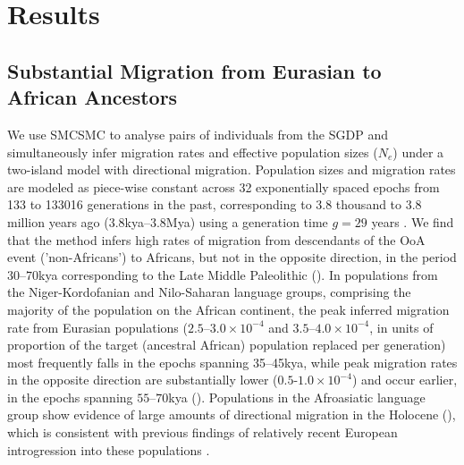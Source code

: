 \section{Results}

\subsection{Substantial Migration from Eurasian to African Ancestors} We use SMCSMC to analyse pairs of individuals from the SGDP and simultaneously infer migration rates and effective population sizes ($N_e$) under a two-island model with directional migration.  Population sizes and migration rates are modeled as piece-wise constant across 32 exponentially spaced epochs from 133 to 133016 generations in the past, corresponding to 3.8 thousand to 3.8 million years ago (3.8kya--3.8Mya) using a generation time $g=29$ years \cite{Fenner2005}.  We find that the method infers high rates of migration from descendants of the OoA event ('non-Africans') to Africans, but not in the opposite direction, in the period $30$--$70$kya corresponding to the Late Middle Paleolithic (). In populations from the Niger-Kordofanian and Nilo-Saharan language groups, comprising the majority of the population on the African continent, the peak inferred migration rate from Eurasian populations ($2.5$--$3.0\times 10^{-4}$ and $3.5$--$4.0\times 10^{-4}$, in units of proportion of the target (ancestral African) population replaced per generation) most frequently falls in the epochs spanning 35--45kya, while peak migration rates in the opposite direction are substantially lower ($0.5$-$1.0\times 10^{-4}$) and occur earlier, in the epochs spanning $55$--$70$kya (). Populations in the Afroasiatic language group show evidence of large amounts of directional migration in the Holocene (), which is consistent with previous findings of relatively recent European introgression into these populations \cite{Busby2016, Fan2019}. 


